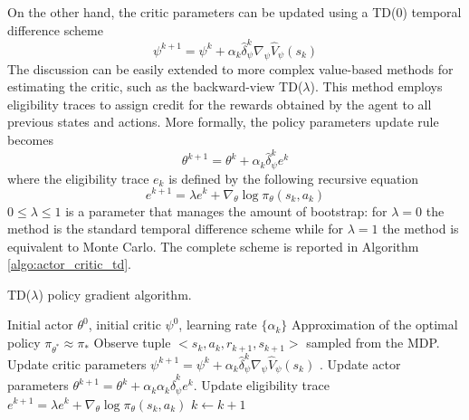 On the other hand, the critic parameters can be updated using a TD(0) temporal difference scheme
\begin{equation}
	\psi^{k+1} = \psi^k + \alpha_k \widehat{\delta}_\psi^k \nabla_\psi \widehat{V}_\psi(s_k)
\end{equation}
The discussion can be easily extended to more complex value-based methods for estimating the critic, such as the backward-view TD($\lambda$). This method employs eligibility traces to assign credit for the rewards obtained by the agent to all previous states and actions. More formally, the policy parameters update rule becomes
\begin{equation}
	\theta^{k+1} = \theta^k + \alpha_k \widehat{\delta}_\psi^k e^k
\end{equation}
where the eligibility trace $e_k$ is defined by the following recursive equation 
\begin{equation}
	e^{k+1} = \lambda e^k + \nabla_\theta\log \pi_\theta(s_k,a_k) 
\end{equation} 
$0 \leq \lambda \leq 1$ is a parameter that manages the amount of bootstrap: for $\lambda = 0$ the method is the standard temporal difference scheme while for $\lambda = 1$ the method is equivalent to Monte Carlo. The complete scheme is reported in Algorithm \ref{algo:actor_critic_td}. 
\begin{algorithm}[t!]
	\caption{TD($\lambda$) policy gradient algorithm.}
	\label{algo:actor_critic_td}
	\begin{algorithmic}[1]
		\Require Initial actor $\theta^0$, initial critic $\psi^0$, learning rate $\{\alpha_k\}$
		\Ensure Approximation of the optimal policy $\pi_{\theta^*} \approx \pi_*$
		\Repeat
			\State Observe tuple $<s_k, a_k, r_{k+1}, s_{k+1}>$ sampled from the MDP.
			\State Update critic parameters $	\psi^{k+1} = \psi^k + \alpha_k \widehat{\delta}_\psi^k \nabla_\psi \widehat{V}_\psi(s_k)$ . 
			\State Update actor parameters $\theta^{k+1} = \theta^k + \alpha_k \alpha_k \widehat{\delta}_\psi^k e^k $. 
			\State Update eligibility trace $e^{k+1} = \lambda e^k + \nabla_\theta\log \pi_\theta(s_k,a_k)$
			\State $k \leftarrow k + 1$
	\end{algorithmic}
\end{algorithm}


